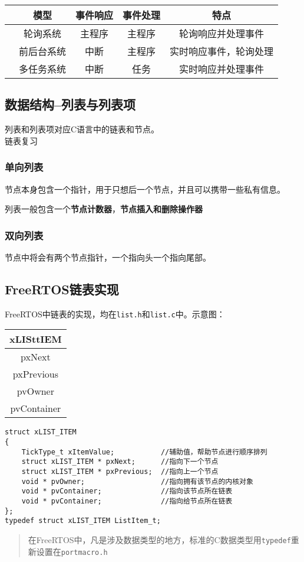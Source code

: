 \documentclass[11pt,a4paper]{ctexart}
\begin{document}
\begin{center}
	\begin{tabular}{|c|c|c|c|c|}
		\hline
		& 模型 & 事件响应 & 事件处理 & 特点 \\ \hline
		& 轮询系统 & 主程序 & 主程序 & 轮询响应并处理事件 \\ \hline
		& 前后台系统 & 中断 & 主程序 & 实时响应事件，轮询处理 \\ \hline
		& 多任务系统 & 中断 & 任务 & 实时响应并处理事件 \\ \hline
	\end{tabular}
\end{center}

\subsection{数据结构--列表与列表项}
\textcolor{myblue}{列表和列表项}对应C语言中的链表和节点。
~\\
\textcolor{myred}{链表复习}
\subsubsection{单向列表}
节点本身包含一个指针，用于只想后一个节点，并且可以携带一些私有信息。

列表一般包含一个\textbf{节点计数器}，\textbf{节点插入和删除操作器}
\subsubsection{双向列表}
节点中将会有两个节点指针，一个指向头一个指向尾部。

\subsection{FreeRTOS链表实现}
FreeRTOS中链表的实现，均在\colorbox{mygrey}{\color{myred}\lstinline|list.h|}和\colorbox{mygrey}{\color{myred}\lstinline|list.c|}中。示意图：
\begin{center}
	\begin{tabular}{|c|}
		\hline
		xLISt\textunderscore tIEM \\ \hline
		pxNext \\ \hline
		pxPrevious \\ \hline
		pvOwner \\ \hline
		pvContainer \\ \hline
	\end{tabular}
\end{center}

\begin{lstlisting}
struct xLIST_ITEM
{
	TickType_t xItemValue;           //辅助值，帮助节点进行顺序排列
	struct xLIST_ITEM * pxNext;      //指向下一个节点
	struct xLIST_ITEM * pxPrevious;  //指向上一个节点
	void * pvOwner;                  //指向拥有该节点的内核对象
	void * pvContainer;              //指向该节点所在链表
	void * pvContainer;              //指向给节点所在链表
};
typedef struct xLIST_ITEM ListItem_t;
\end{lstlisting}
\begin{quote}
	在FreeRTOS中，凡是涉及数据类型的地方，标准的C数据类型用{\color{myred}\lstinline|typedef|}重新设置在{\color{myred}\lstinline|portmacro.h|}
\end{quote}
\end{document}

